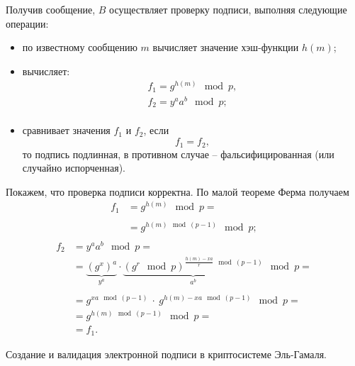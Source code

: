 Получив сообщение, $B$ осуществляет проверку подписи, выполняя следующие операции:
\begin{itemize}
    \item по известному сообщению $m$ вычисляет значение хэш-функции $h(m)$;
    \item вычисляет:
        \[ \begin{array}{l}
            f_1 = g^{h(m)} \mod p, \\
            f_2 = y^a a^b \mod p; \\
        \end{array} \]
    \item сравнивает значения $f_1$ и $f_2$, если
        \[ f_1 = f_2, \]
        то подпись подлинная, в противном случае -- фальсифицированная (или случайно испорченная).
\end{itemize}

Покажем, что проверка подписи корректна. По малой теореме Ферма получаем
\[ \begin{array}{ll}
    f_1 & = g^{h(m)} \mod p = \\
    & \\
    & = g^{h(m) \mod (p-1)} \mod p; \\
\end{array} \] \[ \begin{array}{ll}
    f_2 & = y^a a^b \mod p = \\
    & = \underbrace{\left( g^x \right)^a}_{y^a} \cdot
        \underbrace{\left( g^r \mod p \right)^{\frac{h(m) - xa}{r} \mod (p-1)}}_{a^b} \mod p = \\
    & \\
    & = g^{xa \mod (p-1)} ~\cdot~ g^{h(m) - xa \mod (p-1)} \mod p = \\
    & = g^{h(m) \mod (p-1)} \mod p = \\
    & = f_1.
\end{array} \]

\example Создание и валидация электронной подписи в криптосистеме Эль-Гамаля.


